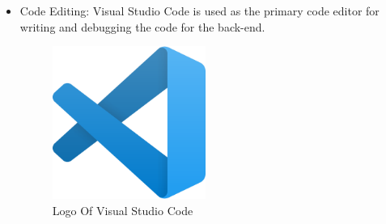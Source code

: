 \begin{itemize}
    \renewcommand\labelitemi{-}
    \item Code Editing: Visual Studio Code is used as the primary code editor for writing and debugging the code for the back-end. \\
          \begin{figure}[H]
              \centering
              \includegraphics[width=5cm]{src/assets/logos/Visual_Studio_Code_1.35_icon.svg.png}
              \caption{  Logo Of Visual Studio Code }
              \label{fig:Vscode_Logo}
          \end{figure}
          

\end{itemize}
